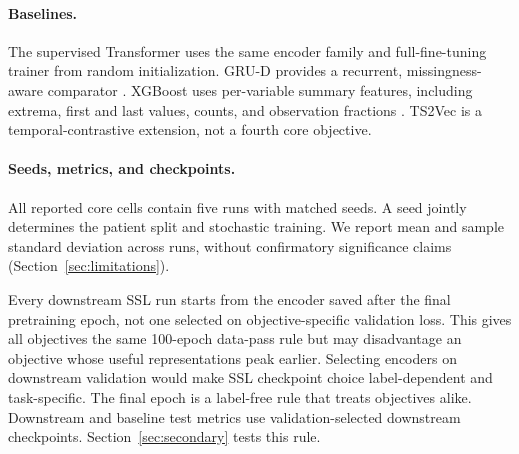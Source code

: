 \paragraph{Baselines.}
The supervised Transformer uses the same encoder family and full-fine-tuning trainer from random initialization. GRU-D provides a recurrent, missingness-aware comparator \citep{che2018grud}. XGBoost uses per-variable summary features, including extrema, first and last values, counts, and observation fractions \citep{chen2016xgboost}. TS2Vec is a temporal-contrastive extension, not a fourth core objective.

\paragraph{Seeds, metrics, and checkpoints.}
All reported core cells contain five runs with matched seeds. A seed jointly determines the patient split and stochastic training. We report mean and sample standard deviation across runs, without confirmatory significance claims (Section~\ref{sec:limitations}).

Every downstream SSL run starts from the encoder saved after the final pretraining epoch, not one selected on objective-specific validation loss. This gives all objectives the same 100-epoch data-pass rule but may disadvantage an objective whose useful representations peak earlier. Selecting encoders on downstream validation would make SSL checkpoint choice label-dependent and task-specific. The final epoch is a label-free rule that treats objectives alike. Downstream and baseline test metrics use validation-selected downstream checkpoints. Section~\ref{sec:secondary} tests this rule.
